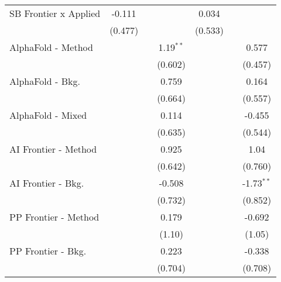 \begin{tabular}{lcccccc}
   SB Frontier x Applied          & -0.111         &                &                & 0.034          &                &   \\   
                                  & (0.477)        &                &                & (0.533)        &                &   \\   
   AlphaFold - Method             &                &                & 1.19$^{**}$    &                &                & 0.577\\   
                                  &                &                & (0.602)        &                &                & (0.457)\\   
   AlphaFold - Bkg.               &                &                & 0.759          &                &                & 0.164\\   
                                  &                &                & (0.664)        &                &                & (0.557)\\   
   AlphaFold - Mixed              &                &                & 0.114          &                &                & -0.455\\   
                                  &                &                & (0.635)        &                &                & (0.544)\\   
   AI Frontier - Method           &                &                & 0.925          &                &                & 1.04\\   
                                  &                &                & (0.642)        &                &                & (0.760)\\   
   AI Frontier - Bkg.             &                &                & -0.508         &                &                & -1.73$^{**}$\\   
                                  &                &                & (0.732)        &                &                & (0.852)\\   
   PP Frontier - Method           &                &                & 0.179          &                &                & -0.692\\   
                                  &                &                & (1.10)         &                &                & (1.05)\\   
   PP Frontier - Bkg.             &                &                & 0.223          &                &                & -0.338\\   
                                  &                &                & (0.704)        &                &                & (0.708)\\   

\end{tabular}

